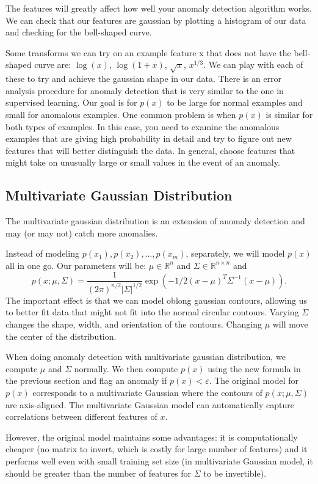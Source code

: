 \documentclass[a4paper,11pt]{report}
\begin{document}
The features will greatly affect how well your anomaly detection algorithm works. We can check that our features are gaussian by plotting a histogram of our data and checking for the bell-shaped curve.

Some transforms we can try on an example feature x that does not have the bell-shaped curve are: $\log(x)$, $\log(1+x)$, $\sqrt{x}$, $x^{1/3}$. We can play with each of these to try and achieve the gaussian shape in our data.
There is an error analysis procedure for anomaly detection that is very similar to the one in supervised learning.
Our goal is for $p(x)$ to be large for normal examples and small for anomalous examples.
One common problem is when $p(x)$ is similar for both types of examples. In this case, you need to examine the anomalous examples that are giving high probability in detail and try to figure out new features that will better distinguish the data.
In general, choose features that might take on unusually large or small values in the event of an anomaly.


\subsection*{Multivariate Gaussian Distribution}

The multivariate gaussian distribution is an extension of anomaly detection and may (or may not) catch more anomalies.

Instead of modeling $p(x_1),p(x_2),\ldots, p(x_m)$, separately, we will model $p(x)$ all in one go. Our parameters will be: $\mu \in \mathbb{R}^n$ and $\Sigma\in \mathbb{R}^{n\times n}$ and
$$p(x;\mu,\Sigma) = \dfrac{1}{(2\pi)^{n/2} |\Sigma|^{1/2}} \exp(-1/2(x-\mu)^T\Sigma^{-1}(x-\mu)).$$
The important effect is that we can model oblong gaussian contours, allowing us to better fit data that might not fit into the normal circular contours.
Varying $\Sigma$ changes the shape, width, and orientation of the contours. Changing $\mu$ will move the center of the distribution.

When doing anomaly detection with multivariate gaussian distribution, we compute $\mu$ and $\Sigma$ normally. We then compute $p(x)$ using the new formula in the previous section and flag an anomaly if $p(x) < \varepsilon$.
The original model for $p(x)$ corresponds to a multivariate Gaussian where the contours of $p(x;\mu,\Sigma)$ are axis-aligned.
The multivariate Gaussian model can automatically capture correlations between different features of $x$.

However, the original model maintains some advantages: it is computationally cheaper (no matrix to invert, which is costly for large number of features) and it performs well even with small training set size (in multivariate Gaussian model, it should be greater than the number of features for $\Sigma$ to be invertible).
\end{document}
